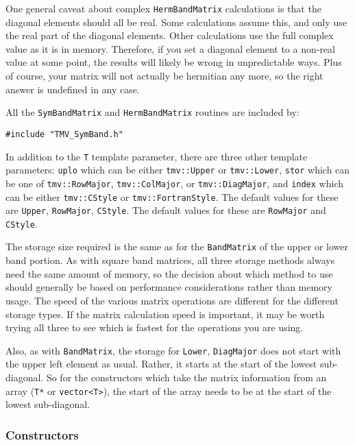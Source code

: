 \documentclass[twoside,letterpaper,11pt]{article}
\renewcommand{\tt}[1]{{\texttt {#1}}}
\begin{document}
One general caveat about complex \tt{HermBandMatrix} calculations is that 
the diagonal elements should all be real.  Some calculations assume this, and 
only use the real part of the diagonal elements.  Other calculations use the 
full complex value as it is in memory.  Therefore, if you set a diagonal element
to a non-real value at some point, the results will likely be wrong in 
unpredictable ways.  Plus of course, your matrix will not actually be 
hermitian any more, so the right answer is undefined in any case.

All the \tt{SymBandMatrix} and \tt{HermBandMatrix} routines are included by:
\begin{verbatim}
#include "TMV_SymBand.h"
\end{verbatim}

In addition to the \tt{T} template parameter, there are three other template 
parameters: \tt{uplo} which can be either \tt{tmv::Upper} or \tt{tmv::Lower},
\tt{stor} which can be one of \tt{tmv::RowMajor}, \tt{tmv::ColMajor}, or 
\tt{tmv::DiagMajor}, and \tt{index} which can be either \tt{tmv::CStyle}
or \tt{tmv::FortranStyle}.  The default values for these are 
\tt{Upper}, \tt{RowMajor}, \tt{CStyle}.
The default values for these are \tt{RowMajor} and \tt{CStyle}.

The storage size required is the same as for the \tt{BandMatrix} of
the upper or lower band portion.
As with square band matrices, 
all three storage methods always need the same amount of memory, so the 
decision about which method to use should generally be based on performance 
considerations rather than memory usage.
The speed of the various matrix operations are different for the different storage 
types.  If the matrix calculation speed is important, it may be worth trying 
all three to see which is fastest for the operations you are using.

Also, as with \tt{BandMatrix}, the storage for \tt{Lower}, \tt{DiagMajor} 
does not start with the upper left element as usual.
Rather, it starts at the start of the lowest sub-diagonal.  
So for the constructors which 
take the matrix information from an array (\tt{T*} or \tt{vector<T>}), 
the start of the array needs to be at the start of the lowest sub-diagonal.  

\subsubsection{Constructors}
\end{document}
